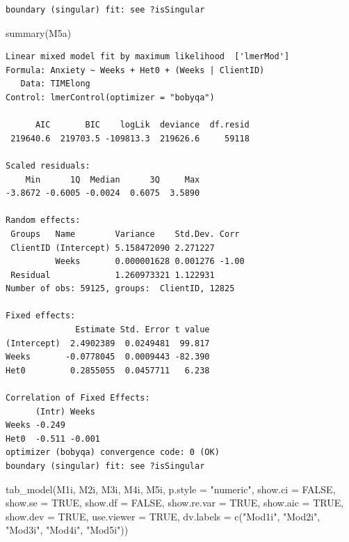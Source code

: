 \documentclass[
  english,
]{book}
\newenvironment{Shaded}{\begin{snugshade}}{\end{snugshade}}
\newcommand{\AttributeTok}[1]{\textcolor[rgb]{0.77,0.63,0.00}{#1}}
\newcommand{\ConstantTok}[1]{\textcolor[rgb]{0.00,0.00,0.00}{#1}}
\newcommand{\FunctionTok}[1]{\textcolor[rgb]{0.00,0.00,0.00}{#1}}
\newcommand{\NormalTok}[1]{#1}
\newcommand{\StringTok}[1]{\textcolor[rgb]{0.31,0.60,0.02}{#1}}
\begin{document}
\begin{verbatim}
boundary (singular) fit: see ?isSingular
\end{verbatim}

\begin{Shaded}
\begin{Highlighting}[]
\FunctionTok{summary}\NormalTok{(M5a)}
\end{Highlighting}
\end{Shaded}

\begin{verbatim}
Linear mixed model fit by maximum likelihood  ['lmerMod']
Formula: Anxiety ~ Weeks + Het0 + (Weeks | ClientID)
   Data: TIMElong
Control: lmerControl(optimizer = "bobyqa")

      AIC       BIC    logLik  deviance  df.resid 
 219640.6  219703.5 -109813.3  219626.6     59118 

Scaled residuals: 
    Min      1Q  Median      3Q     Max 
-3.8672 -0.6005 -0.0024  0.6075  3.5890 

Random effects:
 Groups   Name        Variance    Std.Dev. Corr 
 ClientID (Intercept) 5.158472090 2.271227      
          Weeks       0.000001628 0.001276 -1.00
 Residual             1.260973321 1.122931      
Number of obs: 59125, groups:  ClientID, 12825

Fixed effects:
              Estimate Std. Error t value
(Intercept)  2.4902389  0.0249481  99.817
Weeks       -0.0778045  0.0009443 -82.390
Het0         0.2855055  0.0457711   6.238

Correlation of Fixed Effects:
      (Intr) Weeks 
Weeks -0.249       
Het0  -0.511 -0.001
optimizer (bobyqa) convergence code: 0 (OK)
boundary (singular) fit: see ?isSingular
\end{verbatim}

\begin{Shaded}
\begin{Highlighting}[]
\FunctionTok{tab\_model}\NormalTok{(M1i, M2i, M3i, M4i, M5i, }\AttributeTok{p.style =} \StringTok{"numeric"}\NormalTok{, }\AttributeTok{show.ci =} \ConstantTok{FALSE}\NormalTok{, }\AttributeTok{show.se =} \ConstantTok{TRUE}\NormalTok{, }\AttributeTok{show.df =} \ConstantTok{FALSE}\NormalTok{, }\AttributeTok{show.re.var =} \ConstantTok{TRUE}\NormalTok{, }\AttributeTok{show.aic =} \ConstantTok{TRUE}\NormalTok{, }\AttributeTok{show.dev =} \ConstantTok{TRUE}\NormalTok{, }\AttributeTok{use.viewer =} \ConstantTok{TRUE}\NormalTok{, }\AttributeTok{dv.labels =} \FunctionTok{c}\NormalTok{(}\StringTok{"Mod1i"}\NormalTok{, }\StringTok{"Mod2i"}\NormalTok{, }\StringTok{"Mod3i"}\NormalTok{, }\StringTok{"Mod4i"}\NormalTok{, }\StringTok{"Mod5i"}\NormalTok{))}
\end{Highlighting}
\end{Shaded}
\end{document}
